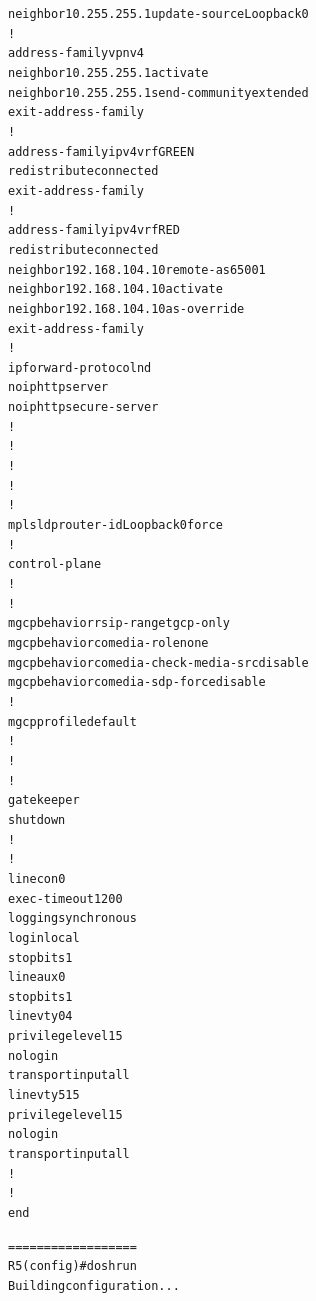 \documentclass[12pt,twoside,a4paper]{report}
\begin{document}
{\begin{small}
\begin{alltt}
 neighbor 10.255.255.1 update-source Loopback0
 !
 address-family vpnv4
  neighbor 10.255.255.1 activate
  neighbor 10.255.255.1 send-community extended
 exit-address-family
 !
 address-family ipv4 vrf GREEN
  redistribute connected
 exit-address-family
 !
 address-family ipv4 vrf RED
  redistribute connected
  neighbor 192.168.104.10 remote-as 65001
  neighbor 192.168.104.10 activate
  neighbor 192.168.104.10 as-override
 exit-address-family
!
ip forward-protocol nd
no ip http server
no ip http secure-server
!
!
!         
!
!
mpls ldp router-id Loopback0 force
!
control-plane
!
!
mgcp behavior rsip-range tgcp-only
mgcp behavior comedia-role none
mgcp behavior comedia-check-media-src disable
mgcp behavior comedia-sdp-force disable
!
mgcp profile default
!
!
!
gatekeeper
 shutdown
!
!
line con 0
 exec-timeout 120 0
 logging synchronous
 login local
 stopbits 1
line aux 0
 stopbits 1
line vty 0 4
 privilege level 15
 no login
 transport input all
line vty 5 15
 privilege level 15
 no login
 transport input all
!
!
end

==================
R5(config)#do sh run
Building configuration...


\end{alltt}
\end{small}}
\end{document}
